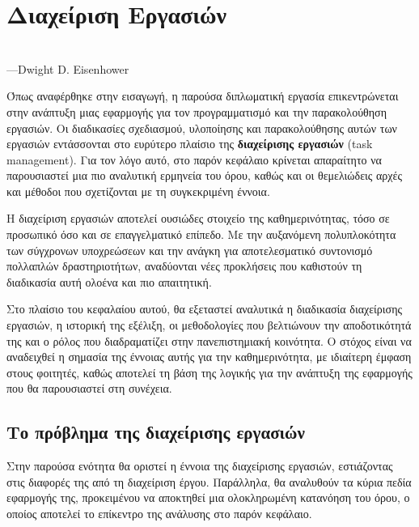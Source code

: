 \chapter{Διαχείριση Εργασιών}
    \begin{displayquote} \centering
         \\
        \hspace*{\fill}---Dwight D. Eisenhower
    \end{displayquote}
    \vspace{1em}

    Όπως αναφέρθηκε στην εισαγωγή, η παρούσα διπλωματική εργασία επικεντρώνεται στην ανάπτυξη μιας εφαρμογής για τον προγραμματισμό και την παρακολούθηση εργασιών. Οι διαδικασίες σχεδιασμού, υλοποίησης και παρακολούθησης αυτών των εργασιών εντάσσονται στο ευρύτερο πλαίσιο της \textbf{διαχείρισης εργασιών} (task management). Για τον λόγο αυτό, στο παρόν κεφάλαιο κρίνεται απαραίτητο να παρουσιαστεί μια πιο αναλυτική ερμηνεία του όρου, καθώς και οι θεμελιώδεις αρχές και μέθοδοι που σχετίζονται με τη συγκεκριμένη έννοια.

    Η διαχείριση εργασιών αποτελεί ουσιώδες στοιχείο της καθημερινότητας, τόσο σε προσωπικό όσο και σε επαγγελματικό επίπεδο. Με την αυξανόμενη πολυπλοκότητα των σύγχρονων υποχρεώσεων και την ανάγκη για αποτελεσματικό συντονισμό πολλαπλών δραστηριοτήτων, αναδύονται νέες προκλήσεις που καθιστούν τη διαδικασία αυτή ολοένα και πιο απαιτητική.

    Στο πλαίσιο του κεφαλαίου αυτού, θα εξεταστεί αναλυτικά η διαδικασία διαχείρισης εργασιών, η ιστορική της εξέλιξη, οι μεθοδολογίες που βελτιώνουν την αποδοτικότητά της και ο ρόλος που διαδραματίζει στην πανεπιστημιακή κοινότητα. Ο στόχος είναι να αναδειχθεί η σημασία της έννοιας αυτής για την καθημερινότητα, με ιδιαίτερη έμφαση στους φοιτητές, καθώς αποτελεί τη βάση της λογικής για την ανάπτυξη της εφαρμογής που θα παρουσιαστεί στη συνέχεια.

    \section{Το πρόβλημα της διαχείρισης εργασιών}
        Στην παρούσα ενότητα θα οριστεί η έννοια της διαχείρισης εργασιών, εστιάζοντας στις διαφορές της από τη διαχείριση έργου. Παράλληλα, θα αναλυθούν τα κύρια πεδία εφαρμογής της, προκειμένου να αποκτηθεί μια ολοκληρωμένη κατανόηση του όρου, ο οποίος αποτελεί το επίκεντρο της ανάλυσης στο παρόν κεφάλαιο.

